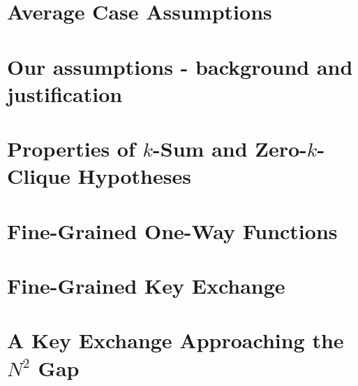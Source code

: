 \section{Average Case Assumptions}\label{sec:averageCaseAssumptions}


\section{Our assumptions - background and justification}\label{sec:justifyAssumptions}


\section{Properties of \texorpdfstring{$k$}{}-Sum and Zero-\texorpdfstring{$k$}{}-Clique Hypo\-theses}\label{sec:kcliqueksumAllTHeThings}

%

\section{Fine-Grained One-Way Functions}\label{sec:fg-owfs}


\section{Fine-Grained Key Exchange}\label{sec:FineGrainedKeyExchange}



\section{A Key Exchange Approaching the \texorpdfstring{$N^2$}{} Gap}\label{sec:n2-gap-keyxc}






